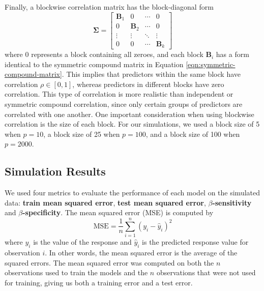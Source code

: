 \documentclass{article}
\begin{document}
Finally, a blockwise correlation matrix has the block-diagonal form
\begin{equation}
	\mathbf{\Sigma} = \begin{bmatrix}
		\mathbf{B}_1 & 0 & \cdots & 0 \\
		0 & \mathbf{B}_2 & \cdots & 0 \\
		\vdots & \vdots & \ddots & \vdots \\
		0 & 0 & \cdots & \mathbf{B}_k
	\end{bmatrix}
\end{equation}
where $0$ represents a block containing all zeroes, and each block $\mathbf{B}_i$ has a form identical to the symmetric compound matrix in Equation \ref{eqn:symmetric-compound-matrix}. This implies that predictors within the same block have correlation $\rho\in [0, 1]$, whereas predictors in different blocks have zero correlation. This type of correlation is more realistic than independent or symmetric compound correlation, since only certain groups of predictors are correlated with one another. One important consideration when using blockwise correlation is the size of each block. For our simulations, we used a block size of 5 when $p = 10$, a block size of 25 when $p = 100$, and a block size of 100 when $p = 2000$.

\subsection{Simulation Results}\label{sec:simulation-results}

We used four metrics to evaluate the performance of each model on the simulated data: \textbf{train mean squared error}, \textbf{test mean squared error}, \textbf{$\beta$-sensitivity} and \textbf{$\beta$-specificity}. The mean squared error (MSE) is computed by
\begin{equation}
	\text{MSE} = \frac{1}{n}\sum\limits_{i = 1}^n (y_i - \hat{y}_i)^2
\end{equation}
where $y_i$ is the value of the response and $\hat{y}_i$ is the predicted response value for observation $i$. In other words, the mean squared error is the average of the squared errors. The mean squared error was computed on both the $n$ observations used to train the models and the $n$ observations that were not used for training, giving us both a training error and a test error.
\end{document}
